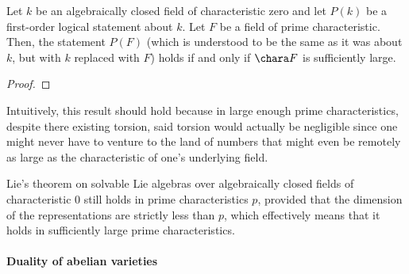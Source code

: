         \begin{proposition}
            Let $k$ be an algebraically closed field of characteristic zero and let $P(k)$ be a first-order logical statement about $k$. Let $F$ be a field of prime characteristic. Then, the statement $P(F)$ (which is understood to be the same as it was about $k$, but with $k$ replaced with $F$) holds if and only if $\chara F$ is sufficiently large. 
        \end{proposition}
            \begin{proof}
                
            \end{proof}
        \begin{remark}
            Intuitively, this result should hold because in large enough prime characteristics, despite there existing torsion, said torsion would actually be negligible since one might never have to venture to the land of numbers that might even be remotely as large as the characteristic of one's underlying field.
        \end{remark}
        \begin{example}
            Lie's theorem on solvable Lie algebras over algebraically closed fields of characteristic $0$ still holds in prime characteristics $p$, provided that the dimension of the representations are strictly less than $p$, which effectively means that it holds in sufficiently large prime characteristics. 
        \end{example}
    
    \paragraph{Duality of abelian varieties}